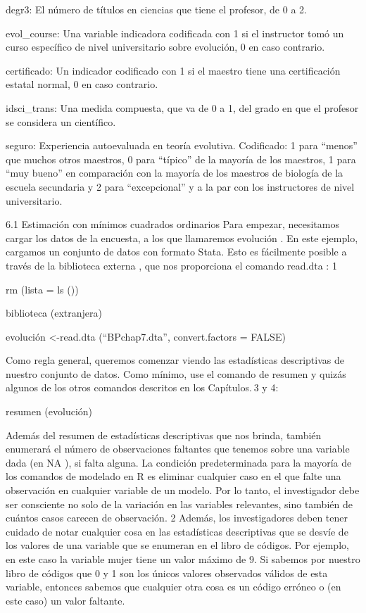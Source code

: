 \documentclass[
]{book}
\begin{document}
degr3:
El número de títulos en ciencias que tiene el profesor, de 0 a 2.

evol\_course:
Una variable indicadora codificada con 1 si el instructor tomó un curso específico de nivel universitario sobre evolución, 0 en caso contrario.

certificado:
Un indicador codificado con 1 si el maestro tiene una certificación estatal normal, 0 en caso contrario.

idsci\_trans:
Una medida compuesta, que va de 0 a 1, del grado en que el profesor se considera un científico.

seguro:
Experiencia autoevaluada en teoría evolutiva. Codificado: 1 para ``menos'' que muchos otros maestros, 0 para ``típico'' de la mayoría de los maestros, 1 para ``muy bueno'' en comparación con la mayoría de los maestros de biología de la escuela secundaria y 2 para ``excepcional'' y a la par con los instructores de nivel universitario.

6.1 Estimación con mínimos cuadrados ordinarios
Para empezar, necesitamos cargar los datos de la encuesta, a los que llamaremos evolución . En este ejemplo, cargamos un conjunto de datos con formato Stata. Esto es fácilmente posible a través de la biblioteca externa , que nos proporciona el comando read.dta : 1

rm (lista = ls ())

biblioteca (extranjera)

evolución \textless-read.dta (``BPchap7.dta'', convert.factors = FALSE)

Como regla general, queremos comenzar viendo las estadísticas descriptivas de nuestro conjunto de datos. Como mínimo, use el comando de resumen y quizás algunos de los otros comandos descritos en los Capítulos. 3 y 4:

resumen (evolución)

Además del resumen de estadísticas descriptivas que nos brinda, también enumerará el número de observaciones faltantes que tenemos sobre una variable dada (en NA ), si falta alguna. La condición predeterminada para la mayoría de los comandos de modelado en R es eliminar cualquier caso en el que falte una observación en cualquier variable de un modelo. Por lo tanto, el investigador debe ser consciente no solo de la variación en las variables relevantes, sino también de cuántos casos carecen de observación. 2 Además, los investigadores deben tener cuidado de notar cualquier cosa en las estadísticas descriptivas que se desvíe de los valores de una variable que se enumeran en el libro de códigos. Por ejemplo, en este caso la variable mujer tiene un valor máximo de 9. Si sabemos por nuestro libro de códigos que 0 y 1 son los únicos valores observados válidos de esta variable, entonces sabemos que cualquier otra cosa es un código erróneo o (en este caso) un valor faltante.
\end{document}
